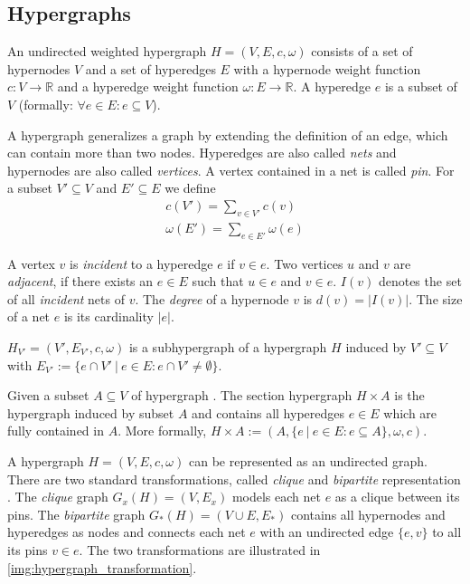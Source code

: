 \subsection{Hypergraphs}
\label{sec:hypergraph}

\begin{definition}[Hypergraph]
An undirected weighted hypergraph $H = (V,E,c,\omega)$ consists of a set of hypernodes $V$ 
and a set of hyperedges $E$ with a hypernode weight function 
$c: V \rightarrow \mathbb{R}$ and a hyperedge weight 
function $\omega: E \rightarrow \mathbb{R}$. A hyperedge $e$ 
is a subset of $V$ (formally: $\forall e \in E: e \subseteq V$).
\label{def:hypergraph}
\end{definition}

A hypergraph generalizes a graph by extending the definition of an edge, which 
can contain more than two nodes. Hyperedges are also called \emph{nets} and hypernodes are
also called \emph{vertices}. A vertex contained in a net is called \emph{pin}. 
For a subset $V' \subseteq V$ and $E' \subseteq E$ we
define
\begin{align*}
c(V') = \sum_{v \in V'} c(v) \\
\omega(E') = \sum_{e \in E'} \omega(e)
\end{align*}

A vertex $v$ is \emph{incident} to a hyperedge $e$ if $v \in e$.
Two vertices $u$ and $v$ are \emph{adjacent}, if there exists an 
$e \in E$ such that $u \in e$ and $v \in e$. $I(v)$ denotes the set of all 
\emph{incident} nets of $v$. The \emph{degree} of a hypernode 
$v$ is $d(v) = |I(v)|$. The size of a net $e$ is its cardinality $|e|$.

\begin{definition}[Subhypergraph]
$H_{V'} = (V',E_{V'},c,\omega)$ is a subhypergraph of a hypergraph $H$
induced by $V' \subseteq V$ with $E_{V'} := \{e \cap V'\ |\ e \in E: e 
\cap V' \neq \emptyset\}$.
\label{def:subhypergraph}
\end{definition}

\begin{definition}
Given a subset $A \subseteq V$ of hypergraph \HypergraphDef. The section hypergraph $H \times A$
is the hypergraph induced by subset $A$ and contains all hyperedges $e \in E$ which are 
fully contained in $A$.
More formally, $H \times A := (A, \{e\ |\ e \in E: e \subseteq A\}, \omega, c)$.
\label{def:section_hypergraph}
\end{definition}

A hypergraph $H = (V,E,c,\omega)$ can be represented as an undirected graph. 
There are two standard transformations, called \emph{clique} and \emph{bipartite} 
representation \cite{HuMoerder85}. The \emph{clique} graph $G_x(H) = (V,E_x)$ models
each net $e$ as a clique between its pins. The \emph{bipartite} graph $G_*(H) = 
(V \cup E, E_*)$ contains all hypernodes and hyperedges as nodes and connects each
net $e$ with an undirected edge $\{e,v\}$ to all its pins $v \in e$. The two transformations
are illustrated in \autoref{img:hypergraph_transformation}.

